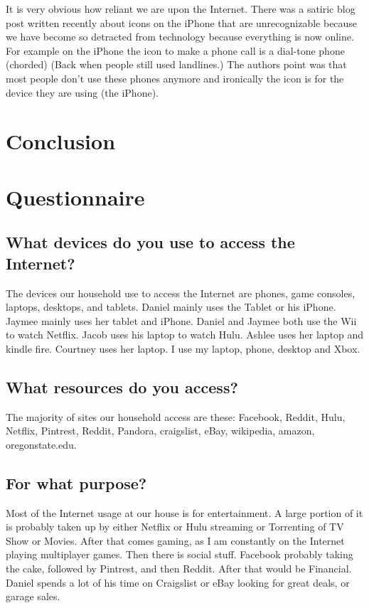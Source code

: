 \documentclass[12pt,letterpaper]{article}
\begin{document}
It is very obvious how reliant we are upon the Internet. There was a
satiric blog post written recently about icons on the iPhone that are
unrecognizable because we have become so detracted from technology
because everything is now online. For example on the iPhone the icon to
make a phone call is a dial-tone phone (chorded) (Back when people still
used landlines.)  The authors point was that most people don't use these
phones anymore and ironically the icon is for the device they are using
(the iPhone).


\section{Conclusion}

\section{Questionnaire}
\subsection{What devices do you use to access the Internet?}
The devices our household use to access the Internet are phones, game
consoles, laptops, desktops, and tablets. Daniel mainly uses the Tablet
or his iPhone. Jaymee mainly uses her tablet and iPhone. Daniel and
Jaymee both use the Wii to watch Netflix. Jacob uses his
laptop to watch Hulu. Ashlee uses her laptop and kindle fire. Courtney uses her
laptop. I use my laptop, phone, desktop and Xbox.

\subsection{What resources do you access?}
The majority of sites our household access are these:
Facebook, Reddit, Hulu, Netflix, Pintrest, Reddit, Pandora, craigslist,
eBay, wikipedia, amazon, oregonstate.edu.

\subsection{For what purpose?}
Most of the Internet usage at our house is for entertainment. A large
portion of it is probably taken up by either Netflix or Hulu streaming or
Torrenting of TV Show or Movies. After that comes gaming, as I am
constantly on the Internet playing multiplayer games. Then there is
social stuff. Facebook probably taking the cake, followed by Pintrest,
and then Reddit. After that would be Financial. Daniel spends a lot of
his time on Craigslist or eBay looking for great deals, or garage sales.
\end{document}

